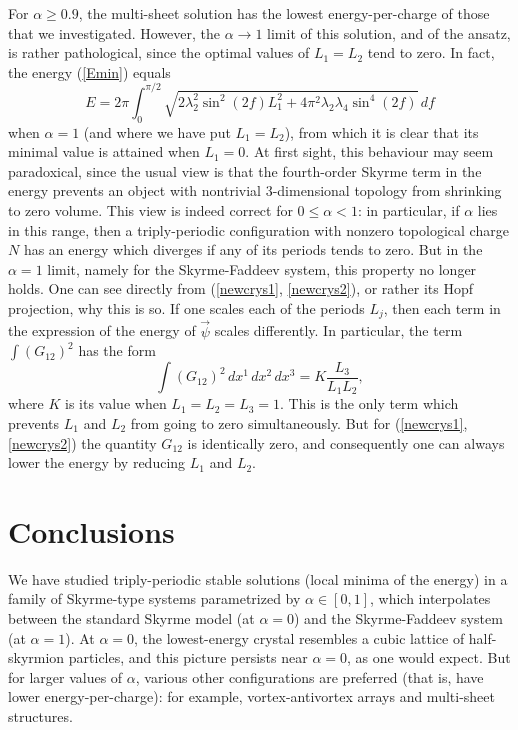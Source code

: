 \documentclass[5p]{elsarticle}
\begin{document}
For $\alpha\geq0.9$, the multi-sheet solution has the lowest
energy-per-charge of those that we investigated.
However, the $\alpha\to1$ limit of this solution, and of the
ansatz, is rather pathological, since the optimal values
of $L_1=L_2$ tend to zero. In fact, the energy (\ref{Emin}) equals
%
\begin{equation} %
  E = 2\pi\int_0^{\pi/2}\sqrt{2\lambda_2^2 \sin^2(2f) L_1^2
          + 4\pi^2 \lambda_2 \lambda_4 \sin^4(2f)}\,df
\end {equation}
%
when $\alpha=1$ (and where we have put $L_1=L_2$), from which it is clear that
its minimal value is attained when $L_1=0$. At first sight, this behaviour may
seem paradoxical, since the usual view is that the fourth-order Skyrme term in
the energy prevents an object with nontrivial 3-dimensional topology from
shrinking to zero volume. This view is indeed correct
for $0\leq\alpha<1$: in particular, if $\alpha$ lies in this range, then
a triply-periodic configuration with nonzero
topological charge $N$ has an energy which diverges if any of its periods tends
to zero. But in the $\alpha=1$ limit, namely for the Skyrme-Faddeev system,
this property no longer holds. One can see directly from
(\ref{newcrys1}, \ref{newcrys2}),
or rather its Hopf projection, why this is so. If one scales
each of the periods $L_j$, then each term in the expression of the energy of
$\vec\psi$ scales differently. In particular,
the term $\int(G_{12})^2$ has the form
\[
  \int(G_{12})^2\,dx^1\,dx^2\,dx^3 = K\frac{L_3}{L_1 L_2},
\]
where $K$ is its value when $L_1=L_2=L_3=1$. This is the only term which
prevents $L_1$ and $L_2$ from going to zero simultaneously. But for
(\ref{newcrys1}, \ref{newcrys2}) the quantity $G_{12}$ is identically zero, and
consequently one can always lower the energy by reducing $L_1$ and $L_2$.


\section{Conclusions}

We have studied triply-periodic stable solutions (local minima of the energy)
in a family of Skyrme-type systems parametrized by $\alpha\in[0,1]$, which
interpolates between the standard Skyrme model (at $\alpha=0$)  and the
Skyrme-Faddeev system (at $\alpha=1$).
At $\alpha=0$, the lowest-energy crystal resembles a cubic lattice of
half-skyrmion particles, and this picture persists near $\alpha=0$,
as one would expect. But for larger values of $\alpha$, various other
configurations are preferred (that is, have lower energy-per-charge):
for example, vortex-antivortex arrays and multi-sheet structures.
\end{document}
